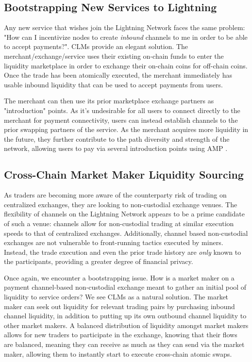 \documentclass[10pt,a4paper]{article}
\theoremstyle{definition}
\begin{document}
\subsection{Bootstrapping New Services to Lightning} 

Any new service that wishes join the Lightning Network faces the same problem:
"How can I incentivize nodes to create \emph{inbound} channels to me in order
to be able to accept payments?". CLMs provide an elegant solution. The
merchant/exchange/service uses their existing on-chain funds to enter the
liquidity marketplace in order to exchange their on-chain coins for off-chain
coins. Once the trade has been atomically executed, the merchant immediately
has usable inbound liquidity that can be used to accept payments from users. 

The merchant can then use its prior marketplace exchange partners as
"introduction" points. As it's undesirable for all users to connect directly to
the merchant for payment connectivity, users can instead establish channels to
the prior swapping partners of the service. As the merchant acquires more
liquidity in the future, they further contribute to the path diversity and
strength of the network, allowing users to pay via several introduction points
using AMP \cite{amp}. 

\subsection{Cross-Chain Market Maker Liquidity Sourcing} 

As traders are becoming more aware of the counterparty risk of trading on
centralized exchanges, they are looking to non-custodial exchange venues. The
flexibility of channels on the Lightning Network appears to be a prime
candidate of such a venue: channels allow for non-custodial trading at similar
execution speeds to that of centralized exchanges. Additionally, channel based
non-custodial exchanges are not vulnerable to front-running tactics executed by
miners. Instead, the trade execution and even the prior trade history are
\emph{only} known to the participants, providing a greater degree of
financial privacy. 

Once again, we encounter a bootstrapping issue. How is a market maker on a
payment channel-based non-custodial exchange meant to gather an initial pool of
liquidity to service orders? We see CLMs as a natural solution. The market
maker can seek out liquidity for relevant trading pairs by purchasing inbound
channel liquidity, in addition to putting up its own outbound channel liquidity
to other market makers. A balanced distribution of liquidity amongst market
makers allows for new traders to participate in the exchange, knowing that
their flows are balanced, meaning they can receive as much as they can send via
the market maker, allowing them to instantly start to execute cross-chain
atomic swaps. 
\end{document}

